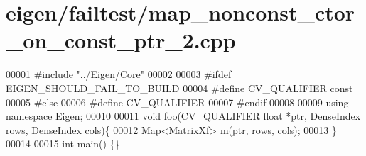 \hypertarget{eigen_2failtest_2map__nonconst__ctor__on__const__ptr__2_8cpp_source}{}\section{eigen/failtest/map\+\_\+nonconst\+\_\+ctor\+\_\+on\+\_\+const\+\_\+ptr\+\_\+2.cpp}
\label{eigen_2failtest_2map__nonconst__ctor__on__const__ptr__2_8cpp_source}

\begin{DoxyCode}
00001 \textcolor{preprocessor}{#include "../Eigen/Core"}
00002 
00003 \textcolor{preprocessor}{#ifdef EIGEN\_SHOULD\_FAIL\_TO\_BUILD}
00004 \textcolor{preprocessor}{#define CV\_QUALIFIER const}
00005 \textcolor{preprocessor}{#else}
00006 \textcolor{preprocessor}{#define CV\_QUALIFIER}
00007 \textcolor{preprocessor}{#endif}
00008 
00009 \textcolor{keyword}{using namespace }\hyperlink{namespace_eigen}{Eigen};
00010 
00011 \textcolor{keywordtype}{void} foo(CV\_QUALIFIER \textcolor{keywordtype}{float} *ptr, DenseIndex rows, DenseIndex cols)\{
00012     \hyperlink{group___core___module_class_eigen_1_1_map}{Map<MatrixXf>} m(ptr, rows, cols);
00013 \}
00014 
00015 \textcolor{keywordtype}{int} main() \{\}
\end{DoxyCode}
